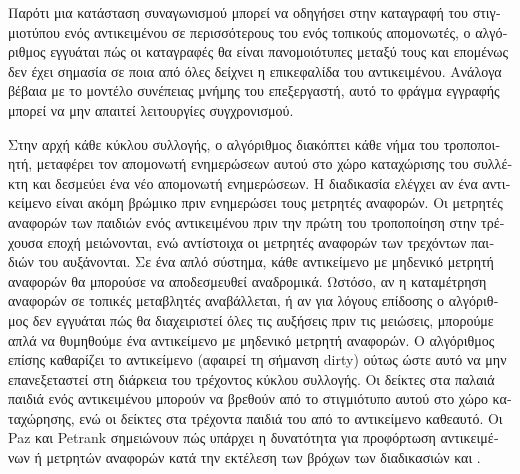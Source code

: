 \begin{greek}
Παρότι μια κατάσταση συναγωνισμού μπορεί να οδηγήσει στην
καταγραφή του στιγμιοτύπου ενός αντικειμένου σε περισσότερους
του ενός τοπικούς απομονωτές, ο αλγόριθμος εγγυάται πώς οι
καταγραφές θα είναι πανομοιότυπες μεταξύ τους και επομένως
δεν έχει σημασία σε ποια από όλες δείχνει η επικεφαλίδα του
αντικειμένου. Ανάλογα βέβαια με το μοντέλο συνέπειας μνήμης
του επεξεργαστή, αυτό το φράγμα εγγραφής μπορεί να μην απαιτεί
λειτουργίες συγχρονισμού.

Στην αρχή κάθε κύκλου συλλογής, ο αλγόριθμος διακόπτει κάθε
νήμα του τροποποιητή, μεταφέρει τον απομονωτή ενημερώσεων
αυτού στο χώρο καταχώρισης του συλλέκτη και δεσμεύει ένα νέο
απομονωτή ενημερώσεων. Η διαδικασία 
ελέγχει αν ένα αντικείμενο είναι ακόμη βρώμικο πριν ενημερώσει
τους μετρητές αναφορών. Οι μετρητές αναφορών των παιδιών ενός
αντικειμένου πριν την πρώτη του τροποποίηση στην τρέχουσα
εποχή μειώνονται, ενώ αντίστοιχα οι μετρητές αναφορών των
τρεχόντων παιδιών του αυξάνονται. Σε ένα απλό σύστημα, κάθε
αντικείμενο με μηδενικό μετρητή αναφορών θα μπορούσε να
αποδεσμευθεί αναδρομικά. Ωστόσο, αν η καταμέτρηση αναφορών
σε τοπικές μεταβλητές αναβάλλεται, ή αν για λόγους επίδοσης
ο αλγόριθμος δεν εγγυάται πώς θα διαχειριστεί όλες τις αυξήσεις
πριν τις μειώσεις, μπορούμε απλά να θυμηθούμε ένα αντικείμενο
με μηδενικό μετρητή αναφορών. Ο αλγόριθμος επίσης καθαρίζει
το αντικείμενο (αφαιρεί τη σήμανση dirty) ούτως ώστε αυτό να
μην επανεξεταστεί στη διάρκεια του τρέχοντος κύκλου συλλογής.
Οι δείκτες στα παλαιά παιδιά ενός αντικειμένου μπορούν να
βρεθούν από το στιγμιότυπο αυτού στο χώρο καταχώρησης, ενώ οι
δείκτες στα τρέχοντα παιδιά του από το αντικείμενο καθεαυτό.
Οι Paz και Petrank σημειώνουν \cite{DBLP:conf/cc/PazP07} πώς
υπάρχει η δυνατότητα για προφόρτωση αντικειμένων ή μετρητών
αναφορών κατά την εκτέλεση των βρόχων των διαδικασιών
 και .


\end{greek}
